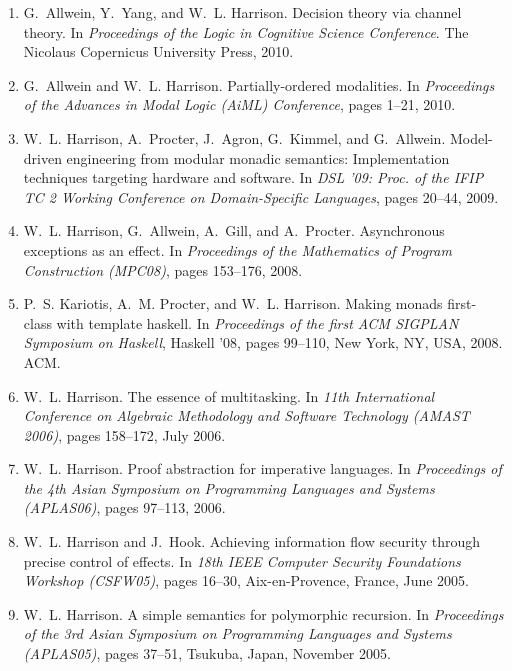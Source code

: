 \documentclass[12pt]{article} %
\begin{document}
\begin{enumerate}[leftmargin=0.0mm]
\item
G.~Allwein, Y.~Yang, and W.~L. Harrison.
\newblock Decision theory via channel theory.
\newblock In {\em Proceedings of the Logic in Cognitive Science Conference}. The Nicolaus Copernicus
  University Press, 2010.

\item
G.~Allwein and W.~L. Harrison.
\newblock Partially-ordered modalities.
\newblock In {\em Proceedings of the Advances in Modal Logic (AiML) Conference}, pages 1--21, 2010.

\item
W.~L. Harrison, A.~Procter, J.~Agron, G.~Kimmel, and G.~Allwein.
\newblock Model-driven engineering from modular monadic semantics:
  Implementation techniques targeting hardware and software.
\newblock In {\em DSL '09: Proc. of the IFIP TC 2 Working Conference on
  Domain-Specific Languages}, pages 20--44, 2009.



\item
W.~L. Harrison, G.~Allwein, A.~Gill, and A.~Procter.
\newblock Asynchronous exceptions as an effect.
\newblock In {\em Proceedings of the Mathematics of Program Construction
  (MPC08)}, pages 153--176, 2008.



\item
P.~S. Kariotis, A.~M. Procter, and W.~L. Harrison.
\newblock Making monads first-class with template haskell.
\newblock In {\em Proceedings of the first ACM SIGPLAN Symposium on Haskell},
  Haskell '08, pages 99--110, New York, NY, USA, 2008. ACM.

\item
W.~L. Harrison.
\newblock The essence of multitasking.
\newblock In {\em 11th International Conference on Algebraic Methodology and
  Software Technology {(AMAST 2006)}}, pages 158--172, July 2006.


\item
W.~L. Harrison.
\newblock Proof abstraction for imperative languages.
\newblock In {\em Proceedings of the 4th Asian Symposium on Programming
  Languages and Systems (APLAS06)}, pages 97--113, 2006.

\item
W.~L. Harrison and J.~Hook.
\newblock Achieving information flow security through precise control of
  effects.
\newblock In {\em 18th IEEE Computer Security Foundations Workshop (CSFW05)},
  pages 16--30, Aix-en-Provence, France, June 2005.

\item
W.~L. Harrison.
\newblock A simple semantics for polymorphic recursion.
\newblock In {\em Proceedings of the 3rd Asian Symposium on Programming
  Languages and Systems (APLAS05)}, pages 37--51, Tsukuba, Japan, November
  2005.


\end{enumerate}
\end{document}
